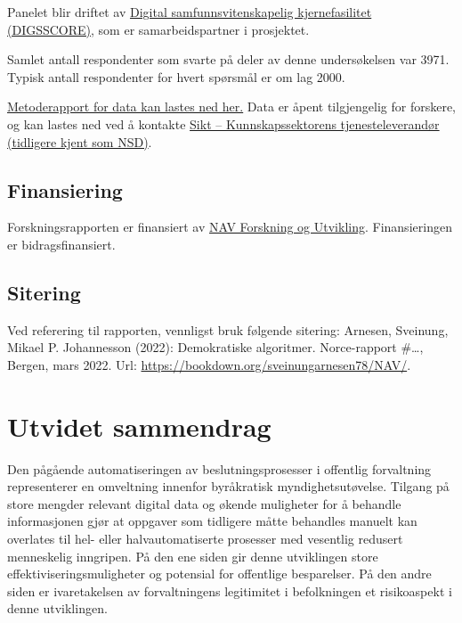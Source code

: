 \documentclass[
]{book}
\begin{document}
Panelet blir driftet av \href{www.digsscore.uib.no}{Digital samfunnsvitenskapelig kjernefasilitet (DIGSSCORE)}, som er samarbeidspartner i prosjektet.

Samlet antall respondenter som svarte på deler av denne undersøkelsen var 3971.
Typisk antall respondenter for hvert spørsmål er om lag 2000.

\href{https://www.uib.no/en/digsscore/122162/methodology-and-field-periods}{Metoderapport for data kan lastes ned her.}
Data er åpent tilgjengelig for forskere, og kan lastes ned ved å kontakte \href{https://sikt.no/}{Sikt -- Kunnskapssektorens tjenesteleverandør (tidligere kjent som NSD)}.

\hypertarget{finansiering}{%
\section{Finansiering}\label{finansiering}}

Forskningsrapporten er finansiert av \href{https://www.nav.no/no/nav-og-samfunn/kunnskap/fou-midler/pagaende-fou-prosjekter2/navs-tiltak-og-virkemidler}{NAV Forskning og Utvikling}.
Finansieringen er bidragsfinansiert.

\hypertarget{sitering}{%
\section{Sitering}\label{sitering}}

Ved referering til rapporten, vennligst bruk følgende sitering:
Arnesen, Sveinung, Mikael P. Johannesson (2022): Demokratiske algoritmer. Norce-rapport \#\ldots, Bergen, mars 2022. Url: \url{https://bookdown.org/sveinungarnesen78/NAV/}.

\hypertarget{sammendrag}{%
\chapter{Utvidet sammendrag}\label{sammendrag}}

Den pågående automatiseringen av beslutningsprosesser i offentlig forvaltning representerer en omveltning innenfor byråkratisk myndighetsutøvelse.
Tilgang på store mengder relevant digital data og økende muligheter for å behandle informasjonen gjør at oppgaver som tidligere måtte behandles manuelt kan overlates til hel- eller halvautomatiserte prosesser med vesentlig redusert menneskelig inngripen.
På den ene siden gir denne utviklingen store effektiviseringsmuligheter og potensial for offentlige besparelser.
På den andre siden er ivaretakelsen av forvaltningens legitimitet i befolkningen et risikoaspekt i denne utviklingen.
\end{document}
